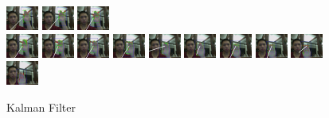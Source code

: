 \documentclass[12pt]{article}
\begin{document}
\begin{figure}[H]
\includegraphics[width=40px, height=30px]{../data/kalman/img0037.jpg}
\includegraphics[width=40px, height=30px]{../data/kalman/img0038.jpg}
\includegraphics[width=40px, height=30px]{../data/kalman/img0039.jpg} \\
\includegraphics[width=40px, height=30px]{../data/kalman/img0040.jpg}
\includegraphics[width=40px, height=30px]{../data/kalman/img0041.jpg}
\includegraphics[width=40px, height=30px]{../data/kalman/img0042.jpg}
\includegraphics[width=40px, height=30px]{../data/kalman/img0043.jpg}
\includegraphics[width=40px, height=30px]{../data/kalman/img0044.jpg}
\includegraphics[width=40px, height=30px]{../data/kalman/img0045.jpg}
\includegraphics[width=40px, height=30px]{../data/kalman/img0046.jpg}
\includegraphics[width=40px, height=30px]{../data/kalman/img0047.jpg}
\includegraphics[width=40px, height=30px]{../data/kalman/img0048.jpg}
\includegraphics[width=40px, height=30px]{../data/kalman/img0049.jpg}
\label{seq-kalman}
\caption{Kalman Filter}
\end{figure}
\end{document}
